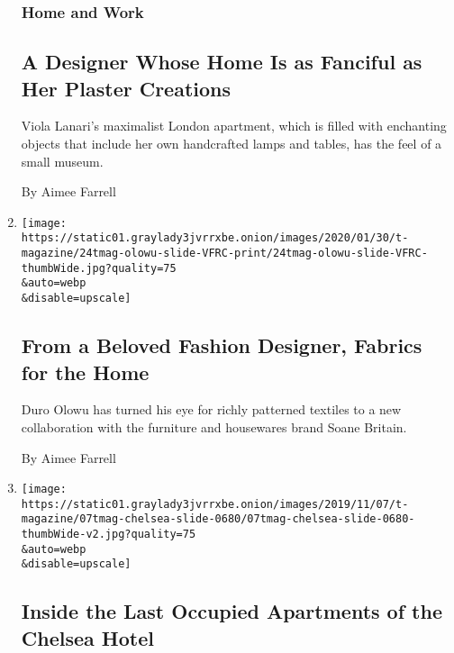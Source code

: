 \begin{enumerate}
  \hypertarget{home-and-work}{%
  \subsubsection{Home and Work}\label{home-and-work}}

  \hypertarget{a-designer-whose-home-is-as-fanciful-as-her-plaster-creations}{%
  \subsection{A Designer Whose Home Is as Fanciful as Her Plaster
  Creations}\label{a-designer-whose-home-is-as-fanciful-as-her-plaster-creations}}

  Viola Lanari's maximalist London apartment, which is filled with
  enchanting objects that include her own handcrafted lamps and tables,
  has the feel of a small museum.

  By Aimee Farrell
\item
  \href{/2020/01/27/t-magazine/duro-olowu-soane.html}{}

  \texttt{[image: https://static01.graylady3jvrrxbe.onion/images/2020/01/30/t-magazine/24tmag-olowu-slide-VFRC-print/24tmag-olowu-slide-VFRC-thumbWide.jpg?quality=75\\\&auto=webp\\\&disable=upscale]}

  \hypertarget{from-a-beloved-fashion-designer-fabrics-for-the-home}{%
  \subsection{From a Beloved Fashion Designer, Fabrics for the
  Home}\label{from-a-beloved-fashion-designer-fabrics-for-the-home}}

  Duro Olowu has turned his eye for richly patterned textiles to a new
  collaboration with the furniture and housewares brand Soane Britain.

  By Aimee Farrell
\item
  \href{/2019/11/07/t-magazine/chelsea-hotel-apartments.html}{}

  \texttt{[image: https://static01.graylady3jvrrxbe.onion/images/2019/11/07/t-magazine/07tmag-chelsea-slide-0680/07tmag-chelsea-slide-0680-thumbWide-v2.jpg?quality=75\\\&auto=webp\\\&disable=upscale]}

  \hypertarget{inside-the-last-occupied-apartments-of-the-chelsea-hotel}{%
  \subsection{Inside the Last Occupied Apartments of the Chelsea
  Hotel}\label{inside-the-last-occupied-apartments-of-the-chelsea-hotel}}


\end{enumerate}
